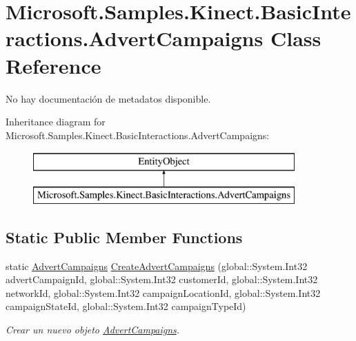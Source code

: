 \hypertarget{class_microsoft_1_1_samples_1_1_kinect_1_1_basic_interactions_1_1_advert_campaigns}{\section{Microsoft.\-Samples.\-Kinect.\-Basic\-Interactions.\-Advert\-Campaigns Class Reference}
\label{class_microsoft_1_1_samples_1_1_kinect_1_1_basic_interactions_1_1_advert_campaigns}
}


No hay documentación de metadatos disponible.  


Inheritance diagram for Microsoft.\-Samples.\-Kinect.\-Basic\-Interactions.\-Advert\-Campaigns\-:\begin{figure}[H]
\begin{center}
\leavevmode
\includegraphics[height=2.000000cm]{class_microsoft_1_1_samples_1_1_kinect_1_1_basic_interactions_1_1_advert_campaigns}
\end{center}
\end{figure}
\subsection*{Static Public Member Functions}
\begin{DoxyCompactItemize}
\item 
static \hyperlink{class_microsoft_1_1_samples_1_1_kinect_1_1_basic_interactions_1_1_advert_campaigns}{Advert\-Campaigns} \hyperlink{class_microsoft_1_1_samples_1_1_kinect_1_1_basic_interactions_1_1_advert_campaigns_af87cfac1dfc472cacd95be99f162a2aa}{Create\-Advert\-Campaigns} (global\-::\-System.\-Int32 advert\-Campaign\-Id, global\-::\-System.\-Int32 customer\-Id, global\-::\-System.\-Int32 network\-Id, global\-::\-System.\-Int32 campaign\-Location\-Id, global\-::\-System.\-Int32 campaign\-State\-Id, global\-::\-System.\-Int32 campaign\-Type\-Id)
\begin{DoxyCompactList}\small\item\em Crear un nuevo objeto \hyperlink{class_microsoft_1_1_samples_1_1_kinect_1_1_basic_interactions_1_1_advert_campaigns}{Advert\-Campaigns}. \end{DoxyCompactList}\end{DoxyCompactItemize}
